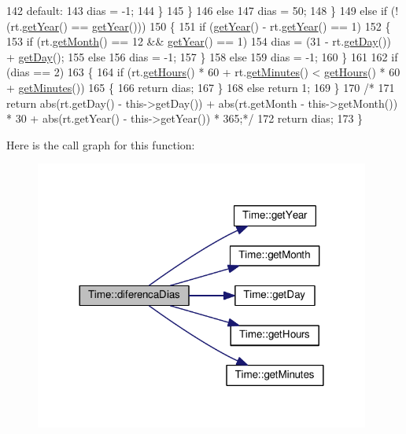 \begin{DoxyCode}
142             \textcolor{keywordflow}{default}:
143                 dias = -1;
144             \}
145         \}
146         \textcolor{keywordflow}{else}
147             dias = 50;
148     \}
149     \textcolor{keywordflow}{else} \textcolor{keywordflow}{if} (!(rt.\hyperlink{classTime_ade4d01d38041bb86a2e1ded9fd3cd28e}{getYear}() == \hyperlink{classTime_ade4d01d38041bb86a2e1ded9fd3cd28e}{getYear}()))
150     \{
151         \textcolor{keywordflow}{if} (\hyperlink{classTime_ade4d01d38041bb86a2e1ded9fd3cd28e}{getYear}() - rt.\hyperlink{classTime_ade4d01d38041bb86a2e1ded9fd3cd28e}{getYear}() == 1)
152         \{
153             \textcolor{keywordflow}{if} (rt.\hyperlink{classTime_a22fd86b14d3b067cf1447fd9ca5caf6f}{getMonth}() == 12 && \hyperlink{classTime_ade4d01d38041bb86a2e1ded9fd3cd28e}{getYear}() == 1)
154                 dias = (31 - rt.\hyperlink{classTime_abdccc37217b520155a67a1d732014f1a}{getDay}()) + \hyperlink{classTime_abdccc37217b520155a67a1d732014f1a}{getDay}();
155             \textcolor{keywordflow}{else}
156                 dias = -1;
157         \}
158         \textcolor{keywordflow}{else}
159             dias = -1;
160     \}
161 
162     \textcolor{keywordflow}{if} (dias == 2)
163     \{
164         \textcolor{keywordflow}{if} (rt.\hyperlink{classTime_ac38ba7bbc9876d7d75c6fb16ba7ac453}{getHours}() * 60 + rt.\hyperlink{classTime_a800d91da444cd295a329925c45942359}{getMinutes}() < \hyperlink{classTime_ac38ba7bbc9876d7d75c6fb16ba7ac453}{getHours}() * 60 + 
      \hyperlink{classTime_a800d91da444cd295a329925c45942359}{getMinutes}())
165         \{
166             \textcolor{keywordflow}{return} dias;
167         \}
168         \textcolor{keywordflow}{else} \textcolor{keywordflow}{return} 1;
169     \}
170     \textcolor{comment}{/*}
171 \textcolor{comment}{    return abs(rt.getDay() - this->getDay()) + abs(rt.getMonth - this->getMonth()) * 30 + abs(rt.getYear()
       - this->getYear()) * 365;*/}
172     \textcolor{keywordflow}{return} dias;
173 \}
\end{DoxyCode}


Here is the call graph for this function\+:
\nopagebreak
\begin{figure}[H]
\begin{center}
\leavevmode
\includegraphics[width=312pt]{classTime_a346c1dbc706dfd41e4a15b16577e4265_cgraph}
\end{center}
\end{figure}


